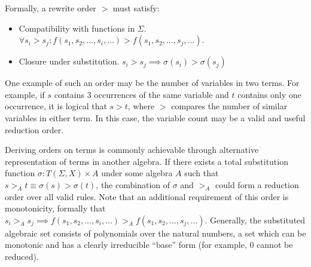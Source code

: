 \documentclass{article}
\begin{document}
Formally, a rewrite order $>$ must satisfy:
\begin{itemize}
    \item Compatibility with functions in $\Sigma$. $\forall s_i > s_j: f(s_1, s_2, ..., s_i, ...) > f(s_1, s_2, ..., s_j, ...)$.
    \item Closure under substitution. $ s_i > s_j \implies \sigma(s_i) > \sigma(s_j)$
\end{itemize}
One example of such an order may be the number of variables in two terms.
For example, if $s$ contains 3 occurrences of the same variable and $t$ contains only one occurrence,
it is logical that $s > t$, where $>$ compares the number of similar variables in either term.
In this case, the variable count may be a valid and useful reduction order.

Deriving orders on terms is commonly achievable through alternative representation of terms in another algebra.
If there exists a total substitution function $\sigma: T(\Sigma,X) \times A$ under some algebra $A$ such that $s >_A t \equiv \sigma(s) > \sigma(t)$,
the combination of $\sigma$ and $>_A$ could form a reduction order over all valid rules. Note that an additional requirement of this order is monotonicity, formally
that $s_i >_A s_j \implies f(s_1, s_2, ..., s_i, ...) >_A f(s_1, s_2, ..., s_j, ...)$. Generally, the substituted algebraic set consists of polynomials over the natural numbers,
a set which can be monotonic and has a clearly irreducible ``base'' form (for example, 0 cannot be reduced).
\end{document}
